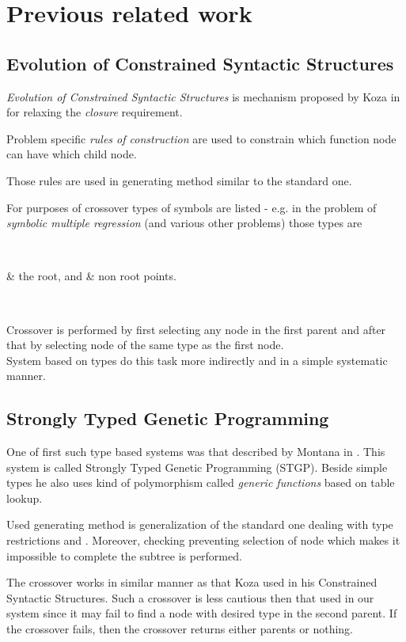 \documentclass[12pt,a4paper]{report}
\begin{document}
		
\chapter{Previous related work}

\section{Evolution of Constrained Syntactic Structures }
\textit{Evolution of Constrained Syntactic Structures}
is mechanism proposed by Koza in \cite{koza92} for relaxing 
the \textit{closure} requirement.

Problem specific \textit{rules of construction}
are used to constrain which function node
can have which child node.

Those rules are used in generating method similar to the standard one.

For purposes of crossover types of symbols are listed - 
e.g. in the problem of \textit{symbolic multiple regression} 
(and various other problems)
those types are 

~\begin{easylist}[itemize]
& the root, and
& non root points.
\end{easylist}~

Crossover is performed by first selecting any node in the first
parent and after that by selecting node of the same type as the first node.\\

System based on types do this task more indirectly and in a
simple systematic manner.

\section{Strongly Typed Genetic Programming}
One of first such type based systems was that described by Montana
in \cite{montana95}. This system is called 
Strongly Typed Genetic Programming (STGP).
Beside simple types he also uses kind of polymorphism 
called \textit{generic functions} based on table lookup.

Used generating method is generalization of the standard one
dealing with type restrictions and . Moreover, checking preventing
selection of node which makes it impossible to complete the subtree 
is performed.

The crossover works in similar manner as that Koza used
in his Constrained Syntactic Structures. Such a crossover
is less cautious then that used in our system
since it may fail to find a node with desired type in the second parent.
If the crossover fails, then the crossover returns either parents or nothing.
\end{document}
